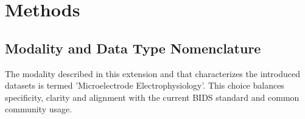 \documentclass[fleqn,10pt]{wlscirep}
\begin{document}
\section*{Methods}







\subsection*{Modality and Data Type Nomenclature}
The modality described in this extension and that characterizes the introduced datasets is termed 'Microelectrode Electrophysiology'. This choice balances specificity, clarity and alignment with the current BIDS standard and common community usage.
\end{document}
